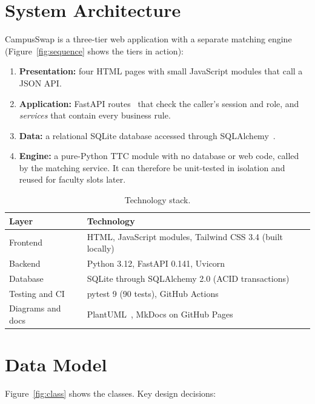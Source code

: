 \documentclass{tietreport}
\begin{document}
\section{System Architecture}

CampusSwap is a three-tier web application with a separate matching
engine (Figure~\ref{fig:sequence} shows the tiers in action):

\begin{enumerate}
  \item \textbf{Presentation:} four HTML pages with small JavaScript
    modules that call a JSON API.
  \item \textbf{Application:} FastAPI routes~\cite{fastapi} that check the
    caller's session and role, and \emph{services} that contain every
    business rule.
  \item \textbf{Data:} a relational SQLite database accessed through
    SQLAlchemy~\cite{sqlalchemy}.
  \item \textbf{Engine:} a pure-Python TTC module with no database or
    web code, called by the matching service. It can therefore be
    unit-tested in isolation and reused for faculty slots later.
\end{enumerate}

\begin{table}[H]
\centering
\begin{tabularx}{\textwidth}{@{}lL@{}}
\toprule
\textbf{Layer} & \textbf{Technology} \\
\midrule
Frontend & HTML, JavaScript modules, Tailwind CSS 3.4 (built locally) \\
Backend & Python 3.12, FastAPI 0.141, Uvicorn \\
Database & SQLite through SQLAlchemy 2.0 (ACID transactions) \\
Testing and CI & pytest 9 (90 tests), GitHub Actions \\
Diagrams and docs & PlantUML~\cite{plantuml}, MkDocs on GitHub Pages \\
\bottomrule
\end{tabularx}
\caption{Technology stack.}
\end{table}

\section{Data Model}

Figure~\ref{fig:class} shows the classes. Key design decisions:
\end{document}
